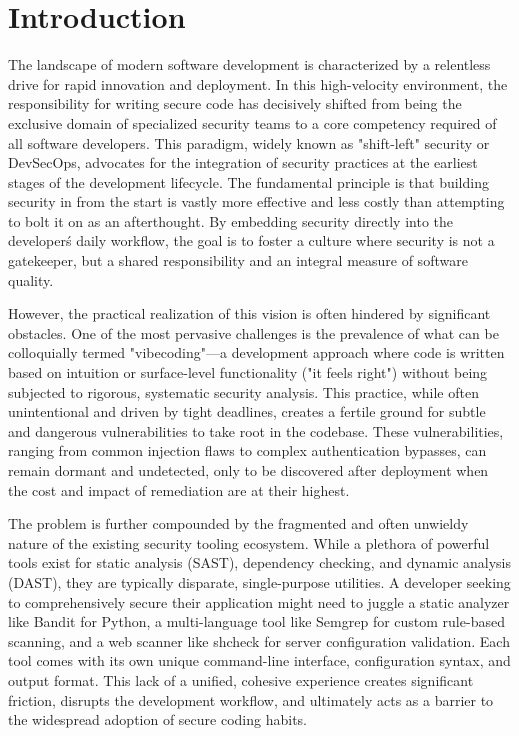 \chapter{Introduction}
\label{chap:intro}
\setlength{\parskip}{1em}

The landscape of modern software development is characterized by a relentless drive for rapid innovation and deployment. In this high-velocity environment, the responsibility for writing secure code has decisively shifted from being the exclusive domain of specialized security teams to a core competency required of all software developers. This paradigm, widely known as "shift-left" security or DevSecOps, advocates for the integration of security practices at the earliest stages of the development lifecycle. The fundamental principle is that building security in from the start is vastly more effective and less costly than attempting to bolt it on as an afterthought. By embedding security directly into the developer\'s daily workflow, the goal is to foster a culture where security is not a gatekeeper, but a shared responsibility and an integral measure of software quality.

However, the practical realization of this vision is often hindered by significant obstacles. One of the most pervasive challenges is the prevalence of what can be colloquially termed "vibecoding"—a development approach where code is written based on intuition or surface-level functionality ("it feels right") without being subjected to rigorous, systematic security analysis. This practice, while often unintentional and driven by tight deadlines, creates a fertile ground for subtle and dangerous vulnerabilities to take root in the codebase. These vulnerabilities, ranging from common injection flaws to complex authentication bypasses, can remain dormant and undetected, only to be discovered after deployment when the cost and impact of remediation are at their highest.

The problem is further compounded by the fragmented and often unwieldy nature of the existing security tooling ecosystem. While a plethora of powerful tools exist for static analysis (SAST), dependency checking, and dynamic analysis (DAST), they are typically disparate, single-purpose utilities. A developer seeking to comprehensively secure their application might need to juggle a static analyzer like Bandit for Python, a multi-language tool like Semgrep for custom rule-based scanning, and a web scanner like shcheck for server configuration validation. Each tool comes with its own unique command-line interface, configuration syntax, and output format. This lack of a unified, cohesive experience creates significant friction, disrupts the development workflow, and ultimately acts as a barrier to the widespread adoption of secure coding habits.

